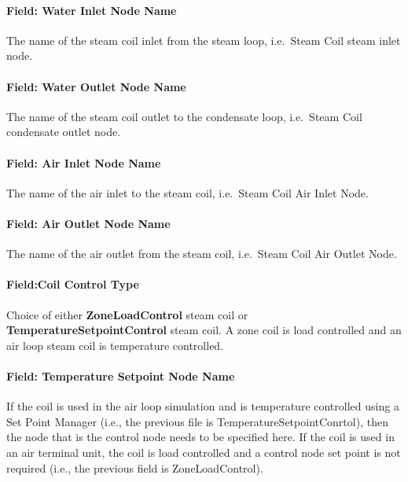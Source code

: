 \paragraph{Field: Water Inlet Node Name}\label{field-water-inlet-node-name-2-000}

The name of the steam coil inlet from the steam loop, i.e.~Steam Coil steam inlet node.

\paragraph{Field: Water Outlet Node Name}\label{field-water-outlet-node-name-2-000}

The name of the steam coil outlet to the condensate loop, i.e.~Steam Coil condensate outlet node.

\paragraph{Field: Air Inlet Node Name}\label{field-air-inlet-node-name-2-001}

The name of the air inlet to the steam coil, i.e.~Steam Coil Air Inlet Node.

\paragraph{Field: Air Outlet Node Name}\label{field-air-outlet-node-name-2-001}

The name of the air outlet from the steam coil, i.e.~Steam Coil Air Outlet Node.

\paragraph{Field:Coil Control Type}\label{fieldcoil-control-type}

Choice of either \textbf{ZoneLoadControl} steam coil or \textbf{TemperatureSetpointControl} steam coil. A zone coil is load controlled and an air loop steam coil is temperature controlled.

\paragraph{Field: Temperature Setpoint Node Name}\label{field-temperature-setpoint-node-name}

If the coil is used in the air loop simulation and is temperature controlled using a Set Point Manager (i.e., the previous file is TemperatureSetpointConrtol), then the node that is the control node needs to be specified here. If the coil is used in an air terminal unit, the coil is load controlled and a control node set point is not required (i.e., the previous field is ZoneLoadControl).

